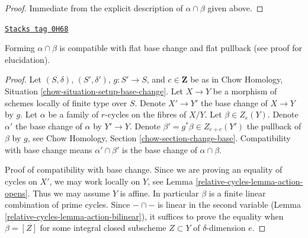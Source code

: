 \begin{proof}
Immediate from the explicit description of $\alpha \cap \beta$
given above.
\end{proof}

\begin{lemma}
\label{relative-cycles-lemma-action-base-change}
\href{https://stacks.math.columbia.edu/tag/0H68}{\texttt{Stacks tag 0H68}}

Forming $\alpha \cap \beta$ is compatible with flat base change
and flat pullback (see proof for elucidation).
\end{lemma}

\begin{proof}
Let $(S, \delta)$, $(S', \delta')$, $g : S' \to S$, and $c \in \mathbf{Z}$
be as in Chow Homology, Situation \ref{chow-situation-setup-base-change}.
Let $X \to Y$ be a morphism of schemes locally of finite type over $S$.
Denote $X' \to Y'$ the base change of $X \to Y$ by $g$.
Let $\alpha$ be a family of $r$-cycles on the fibres of $X/Y$.
Let $\beta \in Z_e(Y)$. Denote $\alpha'$ the
base change of $\alpha$ by $Y' \to Y$. Denote
$\beta' = g^*\beta \in Z_{e + c}(Y')$ the pullback of $\beta$ by $g$, see
Chow Homology, Section \ref{chow-section-change-base}.
Compatibility with base change means
$\alpha' \cap \beta'$ is the base change of $\alpha \cap \beta$.

\medskip\noindent
Proof of compatibility with base change.
Since we are proving an equality of cycles on $X'$, we may work locally
on $Y$, see Lemma \ref{relative-cycles-lemma-action-opens}. Thus we may assume $Y$
is affine. In particular $\beta$ is a finite linear combination of prime
cycles. Since $- \cap -$ is linear in the second variable
(Lemma \ref{relative-cycles-lemma-action-bilinear}), it suffices
to prove the equality when $\beta = [Z]$ for some integral closed subscheme
$Z \subset Y$ of $\delta$-dimension $e$.


\end{proof}
